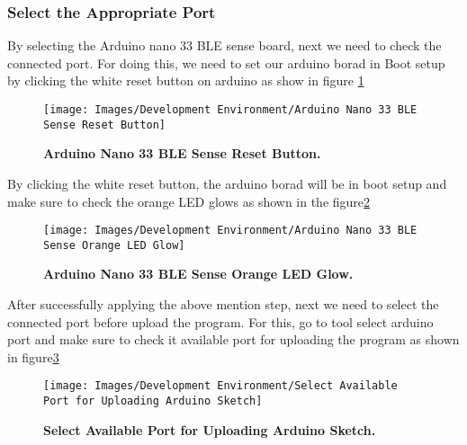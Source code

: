 \subsubsection{Select the Appropriate Port}
By selecting the Arduino nano 33 BLE sense board, next we need to check the connected port. For doing this, we need to set our arduino borad in Boot setup by clicking the white reset button on arduino as show in figure \ref{fig:Arduino Nano 33 BLE Sense Reset Button}

\begin{figure}[H]\centering
	\texttt{[image: Images/Development Environment/Arduino Nano 33 BLE Sense Reset Button]}
	\caption{\textbf{Arduino Nano 33 BLE Sense Reset Button.}}
	\label{fig:Arduino Nano 33 BLE Sense Reset Button}		
\end{figure}
By clicking the white reset button, the arduino borad will be in boot setup and make
sure to check the orange LED glows as shown in the figure\ref{fig:Arduino Nano 33 BLE Sense Orange LED Glow}
\begin{figure}[H]\centering
	\texttt{[image: Images/Development Environment/Arduino Nano 33 BLE Sense Orange LED Glow]}
	\caption{\textbf{Arduino Nano 33 BLE Sense Orange LED Glow.}}
	\label{fig:Arduino Nano 33 BLE Sense Orange LED Glow}		
\end{figure}
After successfully applying the above mention step, next we need to select the connected
port before upload the program. For this, go to tool select arduino port and make
sure to check it available port for uploading the program as shown in figure\ref{fig:Select Available Port for Uploading Arduino Sketch}
\begin{figure}[H]\centering
	\texttt{[image: Images/Development Environment/Select Available Port for Uploading Arduino Sketch]}
	\caption{\textbf{Select Available Port for Uploading Arduino Sketch.}}
	\label{fig:Select Available Port for Uploading Arduino Sketch}		
\end{figure}

